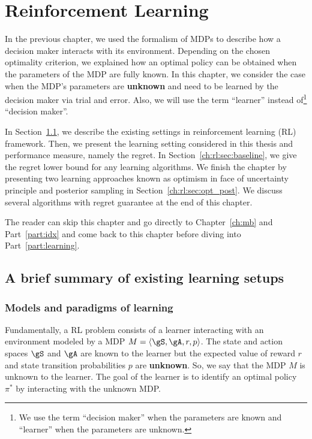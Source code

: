 \begingroup

\let\clearpage\relax

\chapter{Reinforcement Learning}
\label{ch:rl}

In the previous chapter, we used the formalism of MDPs to describe how a decision maker interacts with its environment.
Depending on the chosen optimality criterion, we explained how an optimal policy can be obtained when the parameters of the MDP are fully known.
In this chapter, we consider the case when the MDP's parameters are \textbf{unknown} and need to be learned by the decision maker via trial and error.
Also, we will use the term ``learner'' instead of\footnote{We use the term ``decision maker'' when the parameters are known and ``learner'' when the parameters are unknown.} ``decision maker''.

In Section~\ref{ch:rl:sec:overal}, we describe the existing settings in reinforcement learning (RL) framework.
Then, we present the learning setting considered in this thesis and performance measure, namely the regret. 
In Section~\ref{ch:rl:sec:baseline}, we give the regret lower bound for any learning algorithms.
We finish the chapter by presenting two learning approaches known as optimism in face of uncertainty principle and posterior sampling in Section~\ref{ch:rl:sec:opt_post}.
We discuss several algorithms with regret guarantee at the end of this chapter.

The reader can skip this chapter and go directly to Chapter~\ref{ch:mb} and Part~\ref{part:idx} and come back to this chapter before diving into Part~\ref{part:learning}.

\section{A brief summary of existing learning setups}
\label{ch:rl:sec:overal}

\subsection{Models and paradigms of learning}

Fundamentally, a RL problem consists of a learner interacting with an environment modeled by a MDP $M=\langle\gS,\gA,r,p\rangle$.
The state and action spaces $\gS$ and $\gA$ are known to the learner but the expected value of reward $r$ and state transition probabilities $p$ are \textbf{unknown}.
So, we say that the MDP $M$ is unknown to the learner.
The goal of the learner is to identify an optimal policy $\pi^*$ by interacting with the unknown MDP.


